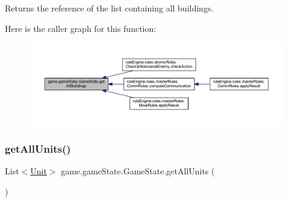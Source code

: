 \begin{DoxyReturn}{Returns}
the reference of the list containing all buildings. 
\end{DoxyReturn}
Here is the caller graph for this function\+:
\nopagebreak
\begin{figure}[H]
\begin{center}
\leavevmode
\includegraphics[width=350pt]{classgame_1_1game_state_1_1_game_state_a9f60d276ddcdaaca453b1767aa03608a_icgraph}
\end{center}
\end{figure}
\mbox{\label{classgame_1_1game_state_1_1_game_state_a07fb5a48de7241b6cb683989bf0a3f9b}} 
\subsubsection{\texorpdfstring{get\+All\+Units()}{getAllUnits()}}
{\footnotesize\ttfamily List$<$\mbox{\hyperlink{classgame_1_1board_1_1_unit}{Unit}}$>$ game.\+game\+State.\+Game\+State.\+get\+All\+Units (\begin{DoxyParamCaption}{ }\end{DoxyParamCaption})\hspace{0.3cm}{\ttfamily [inline]}}

